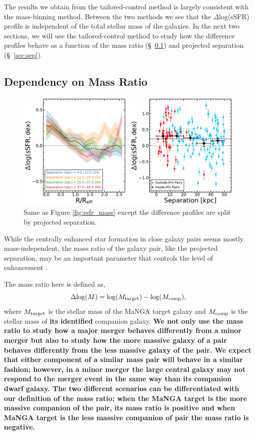 \documentclass[iop,revtex4,twocolumn,apj,numberedappendix,appendixfloats]{emulateapj}
\begin{document}
The results we obtain from the tailored-control method is largely consistent with the mass-binning method. Between the two methods we see that the $\Delta$log(sSFR) profile is independent of the total stellar mass of the galaxies. In the next two sections, we will use the tailored-control method to study how the difference profiles behave as a function of the mass ratio (\S~\ref{sec:dm}) and projected separation (\S~\ref{sec:sep}).

\subsection{Dependency on Mass Ratio}\label{sec:dm}

\begin{figure}
\centering
\includegraphics[width=0.8\linewidth]{fig/ssfr_sep.pdf}
\caption[]{Same as Figure \ref{fig:ssfr_mass} except the difference profiles are split by projected separation. }
\label{fig:ssfr_sep}
\end{figure}

While the centrally enhanced star formation in close galaxy pairs seems mostly mass-independent, the mass ratio of the galaxy pair, like the projected separation, may be an important parameter that controls the level of enhancement \citep{Ellison:2008}. 

The mass ratio here is defined as, 
\begin{equation}
\Delta {\rm log}(M) = {\rm log}(M_{\rm target}) - {\rm log}(M_{\rm comp}),
\end{equation}
where $M_{\rm target}$ is the stellar mass of the MaNGA target galaxy and $M_{\rm comp}$ is the stellar mass of \textbf{its identified} companion galaxy. \textbf{We not only use the mass ratio to study how a major merger behaves differently from a minor merger but also to study how the more massive galaxy of a pair behaves differently from the less massive galaxy of the pair. We expect that either component of a similar mass pair will behave in a similar fashion; however, in a minor merger the large central galaxy may not respond to the merger event in the same way than its companion dwarf galaxy. The two different scenarios can be differentiated with our definition of the mass ratio; when the MaNGA target is the more massive companion of the pair, its mass ratio is positive and when MaNGA target is the less massive companion of pair the mass ratio is negative.}
\end{document}
